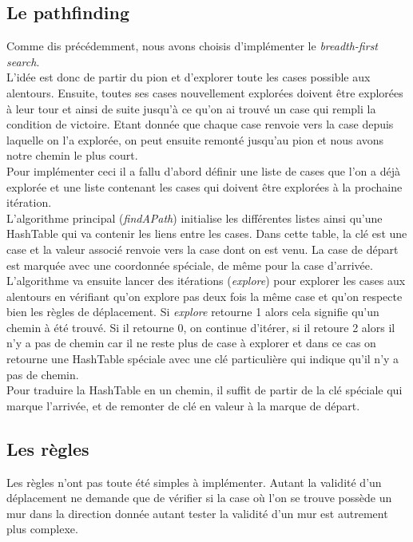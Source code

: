 \documentclass[a4paper, 12pt]{article}
\begin{document}
\subsection{Le pathfinding}
Comme dis précédemment, nous avons choisis d'implémenter le \textit{breadth-first search}. \\

L'idée est donc de partir du pion et d'explorer toute les cases possible aux alentours. Ensuite, toutes ses cases nouvellement explorées doivent être explorées à leur tour et ainsi de suite jusqu'à ce qu'on ai trouvé un case qui rempli la condition de victoire. Etant donnée que chaque case renvoie vers la case depuis laquelle on l'a explorée, on peut ensuite remonté jusqu'au pion et nous avons notre chemin le plus court. \\

Pour implémenter ceci il a fallu d'abord définir une liste de cases que l'on a déjà explorée et une liste contenant les cases qui doivent être explorées à la prochaine itération. \\

L'algorithme principal (\textit{findAPath}) initialise les différentes listes ainsi qu'une HashTable qui va contenir les liens entre les cases. Dans cette table, la clé est une case et la valeur associé renvoie vers la case dont on est venu. La case de départ est marquée avec une coordonnée spéciale, de même pour la case d'arrivée. L'algorithme va ensuite lancer des itérations (\textit{explore}) pour explorer les cases aux alentours en vérifiant qu'on explore pas deux fois la même case et qu'on respecte bien les règles de déplacement. Si \textit{explore} retourne 1 alors cela signifie qu'un chemin à été trouvé. Si il retourne 0, on continue d'itérer, si il retoure 2 alors il n'y a pas de chemin car il ne reste plus de case à explorer et dans ce cas on retourne une HashTable spéciale avec une clé particulière qui indique qu'il n'y a pas de chemin.\\

Pour traduire la HashTable en un chemin, il suffit de partir de la clé spéciale qui marque l'arrivée, et de remonter de clé en valeur à la marque de départ.

\subsection{Les règles}
Les règles n'ont pas toute été simples à implémenter. Autant la validité d'un déplacement ne demande que de vérifier si la case où l'on se trouve possède un mur dans la direction donnée autant tester la validité d'un mur est autrement plus complexe. \\
\end{document}
